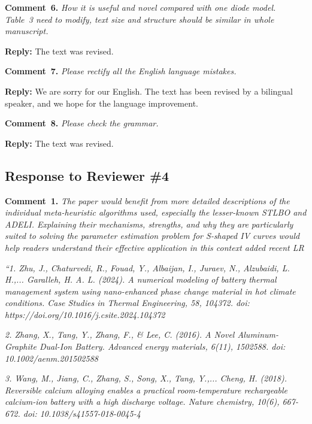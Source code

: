 \documentclass[a4paper,fleqn]{cas-sc}
\begin{document}
\vspace{1cm}
\noindent
\textcolor[rgb]{0.00,0.50,1.00}{\textbf{Comment~6.}}
\emph{How it is useful and novel compared with one diode model.
Table~3 need to modify, text size and structure should be similar in whole manuscript.}

\noindent
\textcolor[rgb]{0.51,0.00,0.00}{\textbf{Reply:}}
The text was revised.

\vspace{1cm}
\noindent
\textcolor[rgb]{0.00,0.50,1.00}{\textbf{Comment~7.}}
\emph{Please rectify all the English language mistakes.}

\noindent
\textcolor[rgb]{0.51,0.00,0.00}{\textbf{Reply:}}
We are sorry for our English. 
The text has been revised by a bilingual speaker, and we hope for the language improvement.


\vspace{1cm}
\noindent
\textcolor[rgb]{0.00,0.50,1.00}{\textbf{Comment~8.}}
\emph{Please check the grammar.}

\noindent
\textcolor[rgb]{0.51,0.00,0.00}{\textbf{Reply:}}
The text was revised.


\vspace{1cm}
\subsection*{Response to Reviewer \#4 }


\noindent
\textcolor[rgb]{0.00,0.50,1.00}{\textbf{Comment~1.}}
\emph{The paper would benefit from more detailed descriptions of the individual meta-heuristic algorithms used,
especially the lesser-known STLBO and ADELI.
Explaining their mechanisms, strengths, and why they are particularly suited to solving the parameter estimation problem
for S-shaped IV curves would help readers understand their effective application in this
context added recent LR}

\emph{
``1. Zhu, J., Chaturvedi, R., Fouad, Y., Albaijan, I., Juraev, N., Alzubaidi, L. H.,... Garalleh, H. A. L. (2024).
A numerical modeling of battery thermal management system using nano-enhanced phase
change material in hot climate conditions. Case Studies in Thermal Engineering, 58, 104372.
doi: https://doi.org/10.1016/j.csite.2024.104372
}

\emph{
2. Zhang, X., Tang, Y., Zhang, F., \& Lee, C. (2016).
A Novel Aluminum-Graphite Dual-Ion Battery. Advanced energy materials, 6(11), 1502588.
doi: 10.1002/aenm.201502588
}

\emph{
3. Wang, M., Jiang, C., Zhang, S., Song, X., Tang, Y.,... Cheng, H. (2018).
Reversible calcium alloying enables a practical room-temperature rechargeable
calcium-ion battery with a high discharge voltage. Nature chemistry, 10(6), 667-672.
doi: 10.1038/s41557-018-0045-4
}
\end{document}
